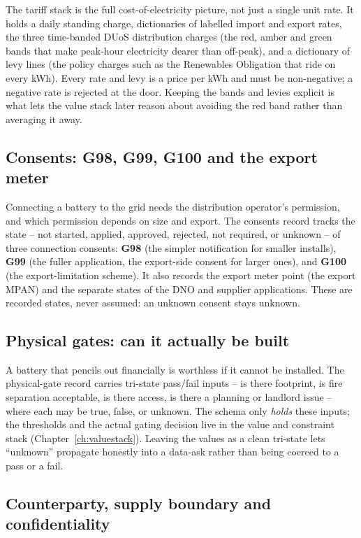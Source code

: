 The tariff stack is the full cost-of-electricity picture, not just a single unit rate. It holds a daily standing charge, dictionaries of labelled import and export rates, the three time-banded DUoS distribution charges (the red, amber and green bands that make peak-hour electricity dearer than off-peak), and a dictionary of levy lines (the policy charges such as the Renewables Obligation that ride on every kWh). Every rate and levy is a price per kWh and must be non-negative; a negative rate is rejected at the door. Keeping the bands and levies explicit is what lets the value stack later reason about avoiding the red band rather than averaging it away.

\subsection{Consents: G98, G99, G100 and the export meter}

Connecting a battery to the grid needs the distribution operator's permission, and which permission depends on size and export. The consents record tracks the state -- not started, applied, approved, rejected, not required, or unknown -- of three connection consents: \textbf{G98} (the simpler notification for smaller installs), \textbf{G99} (the fuller application, the export-side consent for larger ones), and \textbf{G100} (the export-limitation scheme). It also records the export meter point (the export MPAN) and the separate states of the DNO and supplier applications. These are recorded states, never assumed: an unknown consent stays unknown.

\subsection{Physical gates: can it actually be built}

A battery that pencils out financially is worthless if it cannot be installed. The physical-gate record carries tri-state pass/fail inputs -- is there footprint, is fire separation acceptable, is there access, is there a planning or landlord issue -- where each may be true, false, or unknown. The schema only \emph{holds} these inputs; the thresholds and the actual gating decision live in the value and constraint stack (Chapter~\ref{ch:valuestack}). Leaving the values as a clean tri-state lets ``unknown'' propagate honestly into a data-ask rather than being coerced to a pass or a fail.

\subsection{Counterparty, supply boundary and confidentiality}

